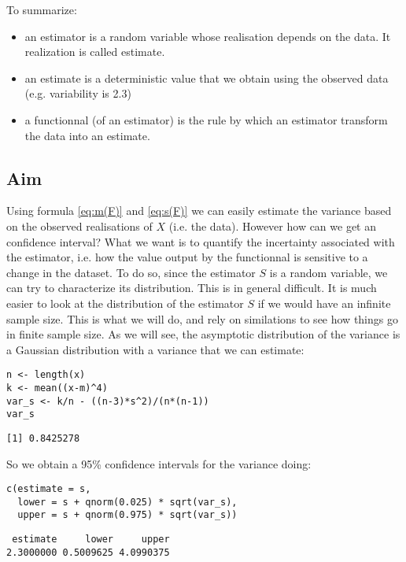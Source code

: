 \documentclass[12pt]{article}
\begin{document}
\bigskip

To summarize:
\begin{itemize}
\item an estimator is a random variable whose realisation depends on the
data. It realization is called estimate.
\item an estimate is a deterministic value that we obtain using the
observed data (e.g. variability is 2.3)
\item a functionnal (of an estimator) is the rule by which an estimator
transform the data into an estimate.
\end{itemize}

\subsection{Aim}
\label{sec:orgdf3c80a}

Using formula \eqref{eq:m(F)} and \eqref{eq:s(F)} we can easily estimate
the variance based on the observed realisations of \(X\) (i.e. the
data). However how can we get an confidence interval? What we want is
to quantify the incertainty associated with the estimator, i.e. how
the value output by the functionnal is sensitive to a change in the
dataset. To do so, since the estimator \(S\) is a random variable, we
can try to characterize its distribution. This is in general
difficult. It is much easier to look at the distribution of the
estimator \(S\) if we would have an infinite sample size. This is what
we will do, and rely on similations to see how things go in finite
sample size. As we will see, the asymptotic distribution of the
variance is a Gaussian distribution with a variance that we can estimate:
\lstset{language=r,label= ,caption= ,captionpos=b,numbers=none}
\begin{lstlisting}
n <- length(x)
k <- mean((x-m)^4)
var_s <- k/n - ((n-3)*s^2)/(n*(n-1))
var_s
\end{lstlisting}

\begin{verbatim}
[1] 0.8425278
\end{verbatim}

So we obtain a 95\% confidence intervals for the variance doing:
\lstset{language=r,label= ,caption= ,captionpos=b,numbers=none}
\begin{lstlisting}
c(estimate = s, 
  lower = s + qnorm(0.025) * sqrt(var_s),
  upper = s + qnorm(0.975) * sqrt(var_s))
\end{lstlisting}

\begin{verbatim}
 estimate     lower     upper 
2.3000000 0.5009625 4.0990375
\end{verbatim}
\end{document}
